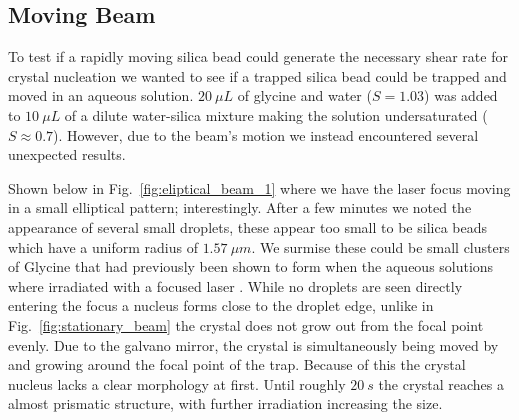 \subsection{Moving Beam}
\label{sec:moving}
To test if a rapidly moving silica bead could generate the necessary shear rate 
for crystal nucleation we wanted to see if a trapped silica bead could be trapped
and moved in an aqueous solution. $20\ \mu L$ of glycine and water ($S=1.03$) was added to $10\ \mu L$ of a dilute water-silica mixture making the solution undersaturated ($S\approx0.7$). However, due to the beam's motion we instead 
encountered several unexpected results. 

Shown below in Fig.~\ref{fig:eliptical_beam_1} where we have the laser focus 
moving in a small elliptical pattern; interestingly. After a few minutes we 
noted the appearance of several small droplets, these appear too small to be 
silica beads which have a uniform radius of $1.57\ \mu m$. We surmise these 
could be small clusters of Glycine that had previously been shown to form 
when the aqueous solutions where irradiated with a focused laser \cite{Tsuboi2009,
Gowayed2021}. While no droplets are seen directly entering the focus a nucleus 
forms close to the droplet edge, unlike in Fig.~\ref{fig:stationary_beam} the 
crystal does not grow out from the focal point evenly. Due to the galvano mirror, 
the crystal is simultaneously being moved by and growing around the focal point 
of the trap. Because of this the crystal nucleus lacks a clear morphology at 
first. Until roughly $20\ s$ the crystal reaches a almost prismatic structure, 
with further irradiation increasing the size.
 
